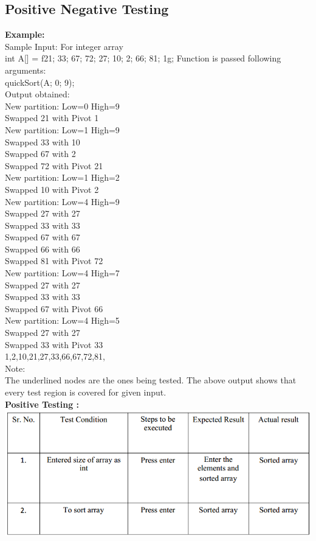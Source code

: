 \documentclass[10pt,a4paper]{article}
\begin{document}
\subsection{Positive Negative Testing}
\textbf{Example:}\\
Sample Input: For integer array\\
int A[] = f21; 33; 67; 72; 27; 10; 2; 66; 81; 1g; Function is passed following arguments:\\
quickSort(A; 0; 9);\\
Output obtained:\\
New partition: Low=0 High=9\\
Swapped 21 with Pivot 1\\
New partition: Low=1 High=9\\
Swapped 33 with 10\\
Swapped 67 with 2\\
Swapped 72 with Pivot 21\\
New partition: Low=1 High=2\\
Swapped 10 with Pivot 2\\
New partition: Low=4 High=9\\
Swapped 27 with 27\\
Swapped 33 with 33\\
Swapped 67 with 67\\
Swapped 66 with 66\\
Swapped 81 with Pivot 72\\
New partition: Low=4 High=7\\
Swapped 27 with 27\\
Swapped 33 with 33\\
Swapped 67 with Pivot 66\\
New partition: Low=4 High=5\\
Swapped 27 with 27\\
Swapped 33 with Pivot 33\\
1,2,10,21,27,33,66,67,72,81,\\
Note:\\
The underlined nodes are the ones being tested. The above output shows that every test region is
covered for given input.\\

\textbf{Positive Testing :}\\
\includegraphics[width=\textwidth]{quicksort_positive}
\vspace{30px}
\end{document}

